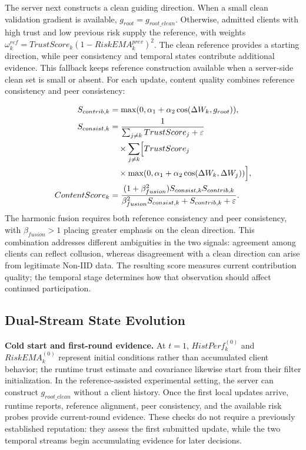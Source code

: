 \documentclass[conference,compsoc]{IEEEtran}
\begin{document}
The server next constructs a clean guiding direction. When a small clean validation gradient is available, $g_{root}=g_{root\_clean}$. Otherwise, admitted clients with high trust and low previous risk supply the reference, with weights $\omega_k^{ref}=TrustScore_k(1-RiskEMA_k^{prev})^2$. The clean reference provides a starting direction, while peer consistency and temporal states contribute additional evidence. This fallback keeps reference construction available when a server-side clean set is small or absent. For each update, content quality combines reference consistency and peer consistency:

\begin{align}
    S_{contrib,k}  & =\max(0,\alpha_1+\alpha_2\cos(\Delta W_k,g_{root})),                   \\
    S_{consist,k}  & =\frac{1}{\sum_{j\ne k}TrustScore_j+\varepsilon}\nonumber              \\
                   & \quad\times\sum_{j\ne k}\Bigl[TrustScore_j\nonumber                    \\
                   & \quad\times\max(0,\alpha_1+\alpha_2\cos(\Delta W_k,\Delta W_j))\Bigr], \\
    ContentScore_k & =\frac{(1+\beta_{fusion}^2)S_{consist,k}S_{contrib,k}}
    {\beta_{fusion}^2S_{consist,k}+S_{contrib,k}+\varepsilon}.
\end{align}
The harmonic fusion requires both reference consistency and peer consistency, with $\beta_{fusion}>1$ placing greater emphasis on the clean direction. This combination addresses different ambiguities in the two signals: agreement among clients can reflect collusion, whereas disagreement with a clean direction can arise from legitimate Non-IID data. The resulting score measures current contribution quality; the temporal stage determines how that observation should affect continued participation.

\subsection{Dual-Stream State Evolution}

\textbf{Cold start and first-round evidence.} At $t=1$, $HistPerf_k^{(0)}$ and $RiskEMA_k^{(0)}$ represent initial conditions rather than accumulated client behavior; the runtime trust estimate and covariance likewise start from their filter initialization. In the reference-assisted experimental setting, the server can construct $g_{root\_clean}$ without a client history. Once the first local updates arrive, runtime reports, reference alignment, peer consistency, and the available risk probes provide current-round evidence. These checks do not require a previously established reputation: they assess the first submitted update, while the two temporal streams begin accumulating evidence for later decisions.
\end{document}
